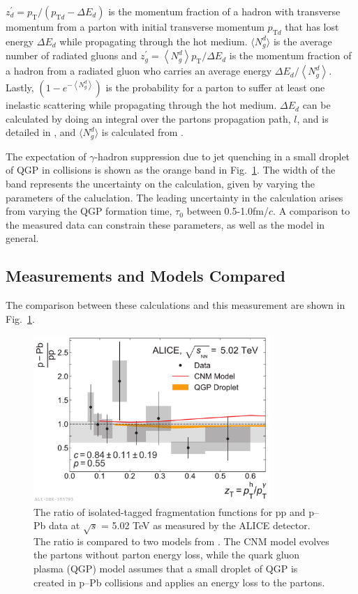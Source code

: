   $z_{d}^{\prime}=p_{\mathrm{T}} /\left(p_{\mathrm{T} d}-\Delta E_{d}\right)$ is the momentum fraction of a hadron with transverse momentum \pt from a parton with initial transverse momentum $p_{\mathrm{T}d}$ that has lost energy $\Delta E_d$ while propagating through the hot medium.  $\langle N_g^d \rangle$ is the average number of radiated gluons and $z_{g}^{\prime}=\left\langle N_{g}^{d}\right\rangle p_{\mathrm{T}} / \Delta E_{d}$ is the momentum fraction of a hadron from a radiated gluon who carries an average energy $\Delta E_{d} /\left\langle N_{g}^{d}\right\rangle$. Lastly, $\left(1-e^{-\left\langle N_{g}^{d}\right\rangle}\right)$ is the probability for a parton to suffer at least one inelastic scattering while propagating through the hot medium. $\Delta E_{d}$ can be calculated by doing an integral over the partons propagation path, $l$, and is detailed in \cite{Wang2002}, and $\langle N_g^d \rangle$ is calculated from \cite{Chang2014}.

  The expectation of $\gamma$-hadron suppression due to jet quenching in a small droplet of QGP in \pPb collisions is shown as the orange band in Fig.~\ref{fig:FF_model}. The width of the band represents the uncertainty on the calculation, given by varying the parameters of the caluclation. The leading uncertainty in the calculation arises from varying the QGP formation time, $\tau_0$ between 0.5-1.0fm/$c$. A comparison to the measured data can constrain these parameters, as well as the model in general.

  \subsection{Measurements and Models Compared}
  \label{sec:comparison}

  The comparison between these calculations and this measurement are shown in Fig.~\ref{fig:FF_model}.

  \begin{figure}[htpb]
    \centering
    \includegraphics[width=0.8\textwidth]{FF_Model_Comparisons_Ratio.pdf}
    \caption{The ratio of isolated-tagged fragmentation functions for pp and p–Pb data at $\sqrt{s}$ = 5.02 TeV as measured by the ALICE detector.  The ratio is compared to two models from \cite{Xie2021}. The CNM model evolves the partons without parton energy loss, while the quark gluon plasma (QGP) model assumes that a small droplet of QGP is created in p–Pb collisions and applies an energy loss to the partons.}
    \label{fig:FF_model}
  \end{figure}

